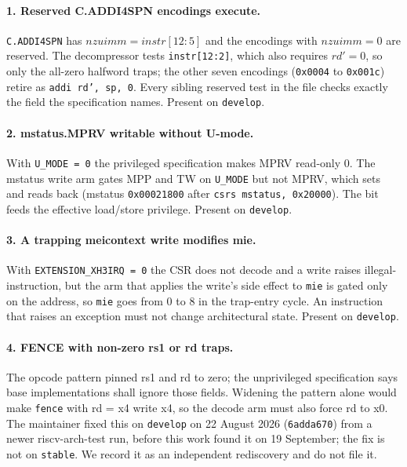 \documentclass[11pt]{article}
\newcommand{\code}[1]{\texttt{#1}}
\begin{document}
\paragraph{1. Reserved C.ADDI4SPN encodings execute.}
\code{C.ADDI4SPN} has $\mathit{nzuimm} = \mathit{instr}[12{:}5]$ and the
encodings with $\mathit{nzuimm} = 0$ are reserved. The decompressor tests
\code{instr[12:2]}, which also requires $rd' = 0$, so only the all-zero
halfword traps; the other seven encodings (\code{0x0004} to \code{0x001c})
retire as \code{addi rd', sp, 0}. Every sibling reserved test in the file
checks exactly the field the specification names. Present on \code{develop}.

\paragraph{2. mstatus.MPRV writable without U-mode.}
With \code{U\_MODE = 0} the privileged specification makes MPRV read-only 0.
The mstatus write arm gates MPP and TW on \code{U\_MODE} but not MPRV, which
sets and reads back (mstatus \code{0x00021800} after \code{csrs mstatus,
0x20000}). The bit feeds the effective load/store privilege. Present on
\code{develop}.

\paragraph{3. A trapping meicontext write modifies mie.}
With \code{EXTENSION\_XH3IRQ = 0} the CSR does not decode and a write raises
illegal-instruction, but the arm that applies the write's side effect to
\code{mie} is gated only on the address, so \code{mie} goes from 0 to 8 in the
trap-entry cycle. An instruction that raises an exception must not change
architectural state. Present on \code{develop}.

\paragraph{4. FENCE with non-zero rs1 or rd traps.}
The opcode pattern pinned rs1 and rd to zero; the unprivileged specification
says base implementations shall ignore those fields. Widening the pattern
alone would make \code{fence} with rd = x4 write x4, so the decode arm must
also force rd to x0. The maintainer fixed this on \code{develop} on 22 August
2026 (\code{6adda670}) from a newer riscv-arch-test run, before this work found
it on 19 September; the fix is not on \code{stable}. We record it as an
independent rediscovery and do not file it.
\end{document}
